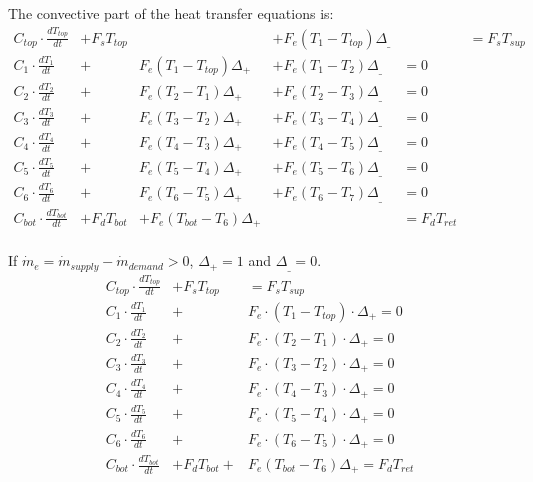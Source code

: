 \begin{scriptsize}
	The convective part of the heat transfer equations is:
	\begin{equation}
		\begin{aligned}
			C_{top} \cdot \frac{dT_{top}}{dt} &+F_s T_{top} &&+ F_e (T_1 - T_{top}) \Delta_{\_} &&= F_s T_{sup}\\
			C_1 \cdot \frac{dT_1}{dt} &+ &F_e (T_1 - T_{top}) \Delta_{+} &+ F_e (T_1 - T_2) \Delta_{\_} &= 0 \\
			C_2 \cdot \frac{dT_2}{dt} &+ &F_e (T_2 - T_1) \Delta_{+} &+ F_e (T_2 - T_3) \Delta_{\_} &= 0 \\
			C_3 \cdot \frac{dT_3}{dt} &+ &F_e (T_3 - T_2) \Delta_{+} &+ F_e (T_3 - T_4) \Delta_{\_} &= 0 \\
			C_4 \cdot \frac{dT_4}{dt} &+ &F_e (T_4 - T_3) \Delta_{+} &+ F_e (T_4 - T_5) \Delta_{\_} &= 0 \\
			C_5 \cdot \frac{dT_5}{dt} &+ &F_e (T_5 - T_4) \Delta_{+} &+ F_e (T_5 - T_6) \Delta_{\_} &= 0 \\
			C_6 \cdot \frac{dT_6}{dt} &+ &F_e (T_6 - T_5) \Delta_{+} &+ F_e (T_6 - T_7) \Delta_{\_} &= 0 \\
			C_{bot} \cdot \frac{dT_{bot}}{dt} &+ F_d T_{bot} &+ F_e (T_{bot} - T_6) \Delta_{+} &&= F_d T_{ret}\\
		\end{aligned}
	\end{equation}
	
	If $\dot{m}_e = \dot{m}_{supply} - \dot{m}_{demand} > 0$, $\Delta_{+} = 1$ and $ \Delta_{\_} = 0 $.
	\begin{equation}
		\begin{aligned}
			C_{top} \cdot \frac{dT_{top}}{dt} &+ F_s T_{top} &= F_s T_{sup}\\
			C_1 \cdot \frac{dT_1}{dt} & + &F_e \cdot (T_1 - T_{top}) \cdot \Delta_{+} = 0 \\
			C_2 \cdot \frac{dT_2}{dt} &+ &F_e \cdot (T_2 - T_1) \cdot \Delta_{+} = 0 \\
			C_3 \cdot \frac{dT_3}{dt} &+ &F_e \cdot (T_3 - T_2) \cdot \Delta_{+} = 0 \\
			C_4 \cdot \frac{dT_4}{dt} &+ &F_e \cdot (T_4 - T_3) \cdot \Delta_{+} = 0\\
			C_5 \cdot \frac{dT_5}{dt} &+ &F_e \cdot (T_5 - T_4) \cdot \Delta_{+} = 0\\
			C_6 \cdot \frac{dT_6}{dt} &+ &F_e \cdot (T_6 - T_5) \cdot \Delta_{+} = 0\\
			C_{bot} \cdot \frac{dT_{bot}}{dt} &+ F_d T_{bot} + & F_e (T_{bot} - T_6) \Delta_{+}  = F_d T_{ret}\\
		\end{aligned}
	\end{equation}
	

\end{scriptsize}
